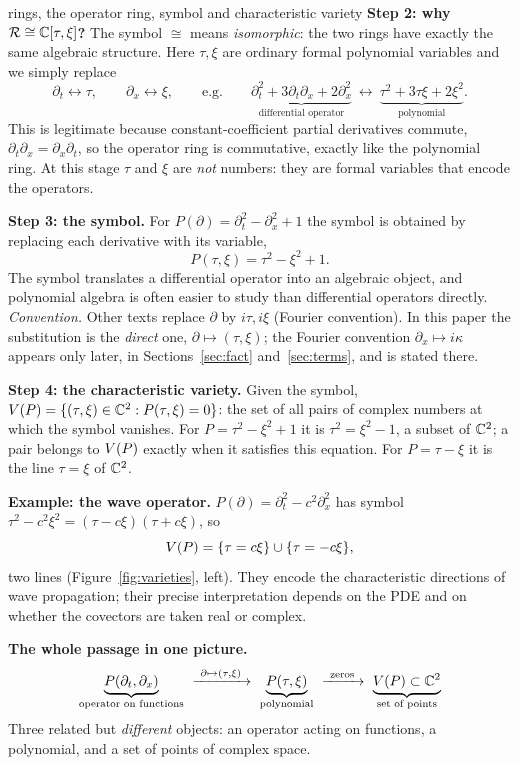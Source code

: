 \begin{explained}{rings, the operator ring, symbol and characteristic variety}
\medskip\textbf{Step 2: why $\mathcal{R}\cong\mathbb{C}[\tau,\xi]$?} The symbol $\cong$ means \emph{isomorphic}: the two rings have exactly the same algebraic structure. Here $\tau,\xi$ are ordinary formal polynomial variables and we simply replace
\[
\partial_t\longleftrightarrow\tau,\qquad\partial_x\longleftrightarrow\xi,
\qquad\text{e.g.}\qquad
\underbrace{\partial_t^2+3\partial_t\partial_x+2\partial_x^2}_{\text{differential operator}}\ \longleftrightarrow\ \underbrace{\tau^2+3\tau\xi+2\xi^2}_{\text{polynomial}} .
\]
This is legitimate because constant-coefficient partial derivatives commute, $\partial_t\partial_x=\partial_x\partial_t$, so the operator ring is commutative, exactly like the polynomial ring. At this stage $\tau$ and $\xi$ are \emph{not} numbers: they are formal variables that encode the operators.

\medskip\textbf{Step 3: the symbol.} For $P(\partial)=\partial_t^2-\partial_x^2+1$ the symbol is obtained by replacing each derivative with its variable,
\[
P(\tau,\xi)=\tau^2-\xi^2+1 .
\]
The symbol translates a differential operator into an algebraic object, and polynomial algebra is often easier to study than differential operators directly. \emph{Convention.} Other texts replace $\partial$ by $i\tau,i\xi$ (Fourier convention). In this paper the substitution is the \emph{direct} one, $\partial\mapsto(\tau,\xi)$; the Fourier convention $\partial_x\mapsto i\kappa$ appears only later, in Sections~\ref{sec:fact} and~\ref{sec:terms}, and is stated there.

\medskip\textbf{Step 4: the characteristic variety.} Given the symbol, $V(P)=\{(\tau,\xi)\in\mathbb{C}^2:P(\tau,\xi)=0\}$: the set of all pairs of complex numbers at which the symbol vanishes. For $P=\tau^2-\xi^2+1$ it is $\tau^2=\xi^2-1$, a subset of $\mathbb{C}^2$; a pair belongs to $V(P)$ exactly when it satisfies this equation. For $P=\tau-\xi$ it is the line $\tau=\xi$ of $\mathbb{C}^2$.

\medskip\textbf{Example: the wave operator.} $P(\partial)=\partial_t^2-c^2\partial_x^2$ has symbol $\tau^2-c^2\xi^2=(\tau-c\xi)(\tau+c\xi)$, so
\[
V(P)=\{\tau=c\xi\}\cup\{\tau=-c\xi\},
\]
two lines (Figure~\ref{fig:varieties}, left). They encode the characteristic directions of wave propagation; their precise interpretation depends on the PDE and on whether the covectors are taken real or complex.

\medskip\textbf{The whole passage in one picture.}
\[
\underbrace{P(\partial_t,\partial_x)}_{\text{operator on functions}}\ \xrightarrow{\ \partial\mapsto(\tau,\xi)\ }\ \underbrace{P(\tau,\xi)}_{\text{polynomial}}\ \xrightarrow{\ \text{zeros}\ }\ \underbrace{\Var(P)\subset\C^2}_{\text{set of points}}
\]
Three related but \emph{different} objects: an operator acting on functions, a polynomial, and a set of points of complex space.
\end{explained}

